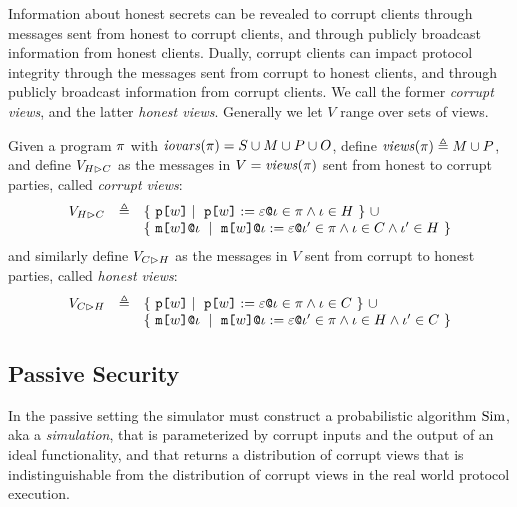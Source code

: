 Information about honest secrets can be revealed to corrupt clients
through messages sent from honest to corrupt clients, and through
publicly broadcast information from honest clients. Dually,
corrupt clients can impact protocol integrity through the messages
sent from corrupt to honest clients, and through publicly broadcast information
from corrupt clients. We call the former \emph{corrupt views}, and
the latter \emph{honest views}. Generally we let $V$ range over sets
of views.
\begin{definition}
  Given a program $\pi$ with $\mathit{iovars}(\pi) = S \cup M \cup P \cup O$,
  define $\mathit{views}(\pi) \triangleq M \cup P$, and define $V_{H \rhd C}$ as the messages in
  $V = \mathit{views}(\pi)$ sent from honest
  to corrupt parties, called \emph{corrupt views}:
  $$
  \begin{array}{lcl}
    \houtputs & \defeq
        & \{\ \rvl{w} \mid\ \reveal{w}{\be}{\cid} \in \prog \wedge \cid \in H \ \}\ \cup \\
      & & \{\ \elab{\mesg{w}}{\cid}\ \mid\  \eassign{\mesg{w}}{\cid}{\be}{\cid'} \in
           \prog \wedge \cid \in C \wedge \cid' \in H \ \} 
  \end{array}
  $$
  and similarly define $V_{C \rhd H}$ as the messages in $V$ sent from corrupt to honest
  parties, called \emph{honest views}:
  $$
  \begin{array}{lcl}
    \cinputs &  \defeq
        & \{\ \rvl{w} \mid\ \reveal{w}{\be}{\cid} \in \prog \wedge \cid \in C \ \} \ \cup\\
      & & \{\ \elab{\mesg{w}}{\cid}\ \mid\  \eassign{\mesg{w}}{\cid}{\be}{\cid'} \in
              \prog \wedge \cid \in H \wedge \cid' \in C \ \}
  \end{array}
  $$
\end{definition}

\subsection{Passive Security}



In the passive setting the simulator must construct a probabilistic
algorithm $\mathrm{Sim}$, aka a \emph{simulation}, that is parameterized by
corrupt inputs and the output of an ideal functionality, and that
returns a distribution of corrupt views that is indistinguishable
from the distribution of corrupt views in the real world
protocol execution.

